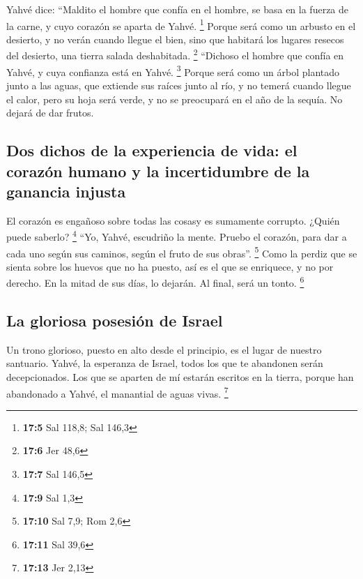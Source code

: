  Yahvé dice: ``Maldito el hombre que confía en el hombre,
se basa en la fuerza de la carne, y cuyo corazón se aparta de Yahvé.
\footnote{\textbf{17:5} Sal 118,8; Sal 146,3}  Porque será
como un arbusto en el desierto, y no verán cuando llegue el bien, sino
que habitará los lugares resecos del desierto, una tierra salada
deshabitada. \footnote{\textbf{17:6} Jer 48,6}  ``Dichoso
el hombre que confía en Yahvé, y cuya confianza está en Yahvé.
\footnote{\textbf{17:7} Sal 146,5}  Porque será como un
árbol plantado junto a las aguas, que extiende sus raíces junto al río,
y no temerá cuando llegue el calor, pero su hoja será verde, y no se
preocupará en el año de la sequía. No dejará de dar frutos.

\hypertarget{dos-dichos-de-la-experiencia-de-vida-el-corazuxf3n-humano-y-la-incertidumbre-de-la-ganancia-injusta}{%
\subsection{Dos dichos de la experiencia de vida: el corazón humano y la
incertidumbre de la ganancia
injusta}\label{dos-dichos-de-la-experiencia-de-vida-el-corazuxf3n-humano-y-la-incertidumbre-de-la-ganancia-injusta}}

 El corazón es engañoso sobre todas las cosasy es
sumamente corrupto. ¿Quién puede saberlo? \footnote{\textbf{17:9} Sal
  1,3}  ``Yo, Yahvé, escudriño la mente. Pruebo el
corazón, para dar a cada uno según sus caminos, según el fruto de sus
obras''. \footnote{\textbf{17:10} Sal 7,9; Rom 2,6}  Como
la perdiz que se sienta sobre los huevos que no ha puesto, así es el que
se enriquece, y no por derecho. En la mitad de sus días, lo dejarán. Al
final, será un tonto. \footnote{\textbf{17:11} Sal 39,6}

\hypertarget{la-gloriosa-posesiuxf3n-de-israel}{%
\subsection{La gloriosa posesión de
Israel}\label{la-gloriosa-posesiuxf3n-de-israel}}

 Un trono glorioso, puesto en alto desde el principio, es
el lugar de nuestro santuario.  Yahvé, la esperanza de
Israel, todos los que te abandonen serán decepcionados. Los que se
aparten de mí estarán escritos en la tierra, porque han abandonado a
Yahvé, el manantial de aguas vivas. \footnote{\textbf{17:13} Jer 2,13}

